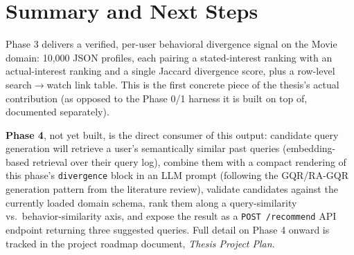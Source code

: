\documentclass[11pt,a4paper]{article}
\newcommand{\code}[1]{\texttt{#1}}
\begin{document}
\section{Summary and Next Steps}

Phase 3 delivers a verified, per-user behavioral divergence signal on the Movie domain: 10{,}000
JSON profiles, each pairing a stated-interest ranking with an actual-interest ranking and a
single Jaccard divergence score, plus a row-level search$\to$watch link table. This is the first
concrete piece of the thesis's actual contribution (as opposed to the Phase 0/1 harness it is
built on top of, documented separately).

\textbf{Phase 4}, not yet built, is the direct consumer of this output: candidate query
generation will retrieve a user's semantically similar past queries (embedding-based retrieval
over their query log), combine them with a compact rendering of this phase's
\code{divergence} block in an LLM prompt (following the GQR/RA-GQR generation pattern from the
literature review), validate candidates against the currently loaded domain schema, rank them
along a query-similarity vs.\ behavior-similarity axis, and expose the result as a
\code{POST /recommend} API endpoint returning three suggested queries. Full detail on Phase 4
onward is tracked in the project roadmap document, \emph{Thesis Project Plan}.
\end{document}
